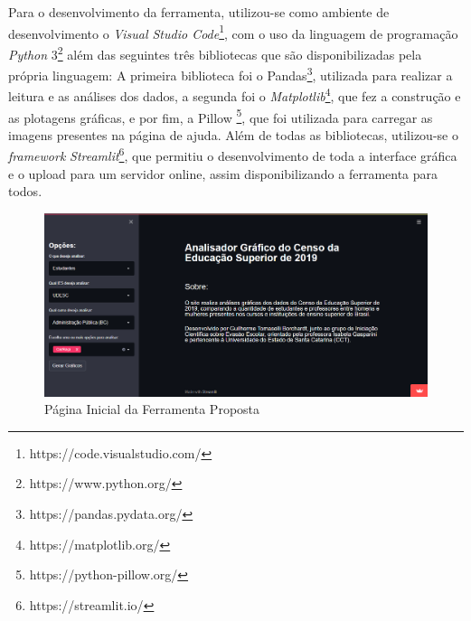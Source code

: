 \documentclass[12pt]{article}
\begin{document}
Para o desenvolvimento da ferramenta, utilizou-se como ambiente de desenvolvimento o \textit{Visual Studio Code}\footnote{https://code.visualstudio.com/}, com o uso da linguagem de programação \textit{Python} 3\footnote{https://www.python.org/} além das seguintes três  bibliotecas que são disponibilizadas pela própria linguagem: A primeira biblioteca foi o Pandas\footnote{https://pandas.pydata.org/}, utilizada para realizar a leitura e as análises dos dados, a segunda foi o \textit{Matplotlib}\footnote{https://matplotlib.org/}, que fez a construção e as plotagens gráficas, e por fim, a Pillow \footnote{https://python-pillow.org/}, que foi utilizada para carregar as imagens presentes na página de ajuda. Além de todas as bibliotecas, utilizou-se o \textit{framework} \textit{Streamlit}\footnote{https://streamlit.io/}, que permitiu o desenvolvimento de toda a interface gráfica e o upload para um servidor online, assim disponibilizando a ferramenta para todos.




\begin{figure}[H]
\centering
\includegraphics[width=1\textwidth]{pagina_inicial.png}
\caption{Página Inicial da Ferramenta Proposta}
\label{fig:pagina_inicial}
\end{figure}
\end{document}
